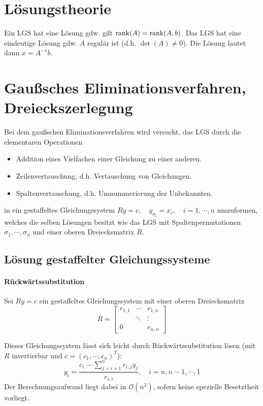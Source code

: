	\section{Lösungstheorie}
		Ein LGS hat eine Lösung gdw. gilt \( \rank(A) = \rank(A, b) \). Das LGS hat eine eindeutige Lösung gdw. \(A\) regulär ist (d.h. \( \det(A) \neq 0 \)). Die Lösung lautet dann \( x = A^{-1} b \).

	\section{Gaußsches Eliminationsverfahren, Dreieckszerlegung}
		Bei dem gaußschen Eliminationsverfahren wird versucht, das LGS durch die elementaren Operationen
		\begin{itemize}
			\item Addition eines Vielfachen einer Gleichung zu einer anderen.
			\item Zeilenvertauschung, d.h. Vertauschung von Gleichungen.
			\item Spaltenvertauschung, d.h. Umnummerierung der Unbekannten.
		\end{itemize}
		in ein gestaffeltes Gleichungssystem \( Ry = c, \quad y_{\sigma_i} = x_i, \quad i = 1, \cdots, n \) umzuformen, welches die selben Lösungen besitzt wie das LGS mit Spaltenpermutationen \( \sigma_1, \cdots, \sigma_n \) und einer oberen Dreiecksmatrix \(R\).

		\subsection{Lösung gestaffelter Gleichungssysteme}
			\paragraph{Rückwärtssubstitution}
				Sei \( Ry = c \) ein gestaffeltes Gleichungssystem mit einer oberen Dreiecksmatrix
				\begin{equation*}
					R =
					\begin{bmatrix}
						r_{1,1} & \cdots & r_{1,n} \\
						        & \ddots & \vdots  \\
						0       &        & r_{n,n}
					\end{bmatrix}
				\end{equation*}

				Dieses Gleichungssystem lässt sich leicht durch Rückwärtssubstitution lösen (mit \(R\) invertierbar und \( c = (c_1, \cdots, c_n)^T \)):
				\begin{equation*}
					y_i = \frac{c_i - \sum_{j = i + 1}^{n} r_{i,j} y_j}{r_{i,i}}, \quad i = n, n - 1, \cdots, 1
				\end{equation*}
				Der Berechnungsaufwand liegt dabei in \( \mathcal{O}(n^2) \), sofern keine spezielle Besetztheit vorliegt.

